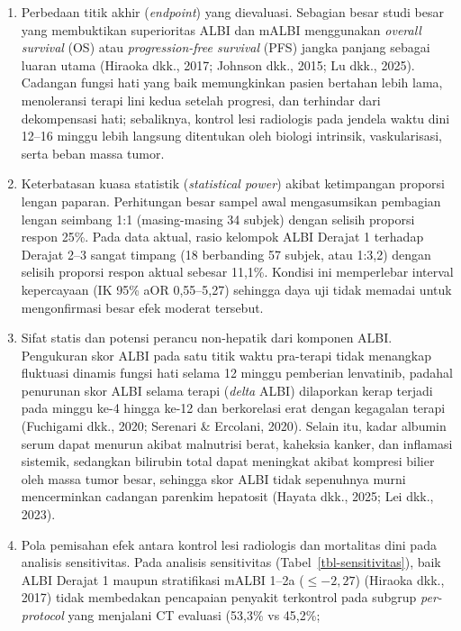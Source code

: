\documentclass[
  indonesian,
]{report}
\providecommand{\tightlist}{%
  \setlength{\itemsep}{0pt}\setlength{\parskip}{0pt}}
\begin{document}
\begin{enumerate}
\def\labelenumi{\arabic{enumi}.}
\tightlist
\item
  Perbedaan titik akhir (\emph{endpoint}) yang dievaluasi. Sebagian
  besar studi besar yang membuktikan superioritas ALBI dan mALBI
  menggunakan \emph{overall survival} (OS) atau \emph{progression-free
  survival} (PFS) jangka panjang sebagai luaran utama (Hiraoka dkk.,
  2017; Johnson dkk., 2015; Lu dkk., 2025). Cadangan fungsi hati yang
  baik memungkinkan pasien bertahan lebih lama, menoleransi terapi lini
  kedua setelah progresi, dan terhindar dari dekompensasi hati;
  sebaliknya, kontrol lesi radiologis pada jendela waktu dini 12--16
  minggu lebih langsung ditentukan oleh biologi intrinsik,
  vaskularisasi, serta beban massa tumor.
\item
  Keterbatasan kuasa statistik (\emph{statistical power}) akibat
  ketimpangan proporsi lengan paparan. Perhitungan besar sampel awal
  mengasumsikan pembagian lengan seimbang 1:1 (masing-masing 34 subjek)
  dengan selisih proporsi respon 25\%. Pada data aktual, rasio kelompok
  ALBI Derajat 1 terhadap Derajat 2--3 sangat timpang (18 berbanding 57
  subjek, atau 1:3,2) dengan selisih proporsi respon aktual sebesar
  11,1\%. Kondisi ini memperlebar interval kepercayaan (IK 95\% aOR
  0,55--5,27) sehingga daya uji tidak memadai untuk mengonfirmasi besar
  efek moderat tersebut.
\item
  Sifat statis dan potensi perancu non-hepatik dari komponen ALBI.
  Pengukuran skor ALBI pada satu titik waktu pra-terapi tidak menangkap
  fluktuasi dinamis fungsi hati selama 12 minggu pemberian lenvatinib,
  padahal penurunan skor ALBI selama terapi (\emph{delta} ALBI)
  dilaporkan kerap terjadi pada minggu ke-4 hingga ke-12 dan berkorelasi
  erat dengan kegagalan terapi (Fuchigami dkk., 2020; Serenari \&
  Ercolani, 2020). Selain itu, kadar albumin serum dapat menurun akibat
  malnutrisi berat, kaheksia kanker, dan inflamasi sistemik, sedangkan
  bilirubin total dapat meningkat akibat kompresi bilier oleh massa
  tumor besar, sehingga skor ALBI tidak sepenuhnya murni mencerminkan
  cadangan parenkim hepatosit (Hayata dkk., 2025; Lei dkk., 2023).
\item
  Pola pemisahan efek antara kontrol lesi radiologis dan mortalitas dini
  pada analisis sensitivitas. Pada analisis sensitivitas
  (Tabel~\ref{tbl-sensitivitas}), baik ALBI Derajat 1 maupun
  stratifikasi mALBI 1--2a (\(\le -2,27\)) (Hiraoka dkk., 2017) tidak
  membedakan pencapaian penyakit terkontrol pada subgrup
  \emph{per-protocol} yang menjalani CT evaluasi (53,3\% vs 45,2\%;

\end{enumerate}
\end{document}
